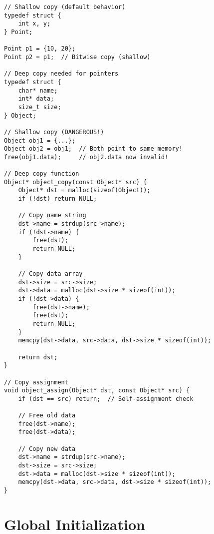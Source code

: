 \begin{lstlisting}
// Shallow copy (default behavior)
typedef struct {
    int x, y;
} Point;

Point p1 = {10, 20};
Point p2 = p1;  // Bitwise copy (shallow)

// Deep copy needed for pointers
typedef struct {
    char* name;
    int* data;
    size_t size;
} Object;

// Shallow copy (DANGEROUS!)
Object obj1 = {...};
Object obj2 = obj1;  // Both point to same memory!
free(obj1.data);     // obj2.data now invalid!

// Deep copy function
Object* object_copy(const Object* src) {
    Object* dst = malloc(sizeof(Object));
    if (!dst) return NULL;

    // Copy name string
    dst->name = strdup(src->name);
    if (!dst->name) {
        free(dst);
        return NULL;
    }

    // Copy data array
    dst->size = src->size;
    dst->data = malloc(dst->size * sizeof(int));
    if (!dst->data) {
        free(dst->name);
        free(dst);
        return NULL;
    }
    memcpy(dst->data, src->data, dst->size * sizeof(int));

    return dst;
}

// Copy assignment
void object_assign(Object* dst, const Object* src) {
    if (dst == src) return;  // Self-assignment check

    // Free old data
    free(dst->name);
    free(dst->data);

    // Copy new data
    dst->name = strdup(src->name);
    dst->size = src->size;
    dst->data = malloc(dst->size * sizeof(int));
    memcpy(dst->data, src->data, dst->size * sizeof(int));
}
\end{lstlisting}

\section{Global Initialization}

